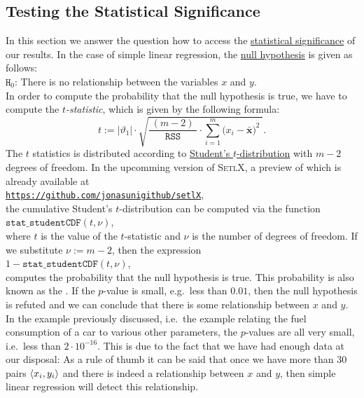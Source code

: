 \subsection{Testing the Statistical Significance}
In this section we answer the question how to access the 
\href{https://en.wikipedia.org/wiki/Statistical_significance}{statistical significance} of our
results.  In the case of simple linear regression, the
\href{https://en.wikipedia.org/wiki/Null_hypothesis}{null hypothesis} is given as follows: 
\\[0.2cm]
\hspace*{1.3cm}
$\mathtt{H}_0$: There is no relationship between the variables $x$ and $y$.
\\[0.2cm]
In order to compute the probability that the null hypothesis is true, we have to compute the
\emph{\color{blue} $t$-statistic}, which is given by the following formula:
\begin{equation}
  \label{eq:t-statistics}
  t := |\vartheta_1| \cdot \sqrt{\frac{\;(m-2)\;}{\mathtt{RSS}} \cdot \sum\limits_{i=1}^m \bigl(x_i - \bar{\mathbf{x}}\bigr)^2\; }.
\end{equation}
The $t$ statistics is distributed according to 
\href{https://en.wikipedia.org/wiki/Student%27s_t-distribution}{Student's $t$-distribution} 
with $m-2$ degrees of freedom.  In the upcomming version of \textsc{SetlX}, a preview of which is already available at
\\[0.2cm]
\hspace*{1.3cm}
\href{https://github.com/jonasunigithub/setlX}{\texttt{https://github.com/jonasunigithub/setlX}},
\\[0.2cm]
the cumulative Student's $t$-distribution can be computed
via the function
\\[0.2cm]
\hspace*{1.3cm}
$\mathtt{stat\_studentCDF}(t, \nu)$,
\\[0.2cm]
where $t$ is the value of the $t$-statistic and $\nu$ is the number of degrees of freedom.  If we substitute
$\nu := m - 2$, then the expression 
\\[0.2cm]
\hspace*{1.3cm}
$1 - \mathtt{stat\_studentCDF}(t, \nu)$,
\\[0.2cm]
 computes the probability that the null hypothesis is true.  This probability
is also known as the .  If the $p$-value is small, e.g.~less than $0.01$, then the null
hypothesis is refuted and we can conclude that there is some relationship between $x$ and $y$.  In the example
previously discussed, i.e.~the example relating the fuel consumption of a car to various other parameters, the
$p$-values are all very small, i.e.~less than $2 \cdot 10^{-16}$.  This is due to the fact that we have had enough data at
our disposal:  As a rule of thumb it can be said that once we have more than 30 pairs $\pair(x_i, y_i)$ and there
is indeed a relationship between $x$ and $y$, then simple linear regression will detect this relationship.

